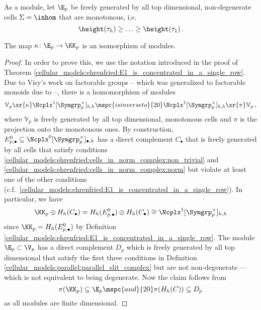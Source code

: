 \begin{defi}
    \label{cellular_models:ehrenfried:definition:cells}
    As a module, let $\E_p$ be freely generated by all top dimensional, non-degenerate cells $\Sigma = \inhom$ that are monotonous, i.e.\
    \[
        \height(\tau_h) \ge \ldots \ge \height(\tau_1) \,.
    \]
\end{defi}

\begin{lem}
    \label{cellular_models:ehrenfried:kappa_is_basechange}
    The map $\kappa \colon \E_p \to \KK_p$ is an isomorphism of modules.
\end{lem}

\begin{proof}
    In order to prove this, we use the notation introduced in the proof of Theorem \ref{cellular_models:ehrenfried:E1_is_concentrated_in_a_single_row}.
    Due to Visy's work on factorable groups \cite[Theorem 5.4.1]{Visy201011} -- which was generalized to factorable monoids due to \cite[Proposition 3.3.6]{Hess2012} --,
    there is a homomorphism of modules
    \[
        \mathbb V_p \xr{\kappa} \Ncplx^1[\Symgrp^\times_p]_{h,h} \mspc{is inverse to}{20} \Ncplx^1[\Symgrp^\times_p]_{h,h} \xr{\pi} \mathbb V_p \,,
    \]
    \label{page:visy_complex}%
    where $\mathbb V_p$ is freely generated by all top dimensional, monotonous cells and $\pi$ is the projection onto the monotonous ones.
    By construction, $E^0_{p,\bullet} \subseteq \Ncplx^0[\Symgrp^\times_p]_{\bullet,h}$ has a direct complement $C_\bullet$ that
    is freely generated by all cells that satisfy conditions \ref{cellular_models:ehrenfried:cells_in_norm_complex:non_trivial} and \ref{cellular_models:ehrenfried:cells_in_norm_complex:norm} but
    violate at least one of the other conditions (c.f.\ \ref{cellular_models:ehrenfried:E1_is_concentrated_in_a_single_row}).
    In particular, we have
    \[
        \KK_p \oplus H_h(C_\bullet) = H_h(E^0_{p,\bullet})\oplus H_h(C_\bullet) \cong \Ncplx^1[\Symgrp^\times_p]_{h,h}
    \]
    since $\KK_p = H_h(E^0_{p,\bullet})$ by Definition \ref{cellular_models:ehrenfried:E1_is_concentrated_in_a_single_row}.
    The module $\E_p \subset \V_p$ has a direct complement $D_p$ which is freely generated by all top dimensional
    that satisfy the first three conditions in Definition \ref{cellular_models:parallel:parallel_slit_complex} but are not non-degenerate --- which is not equivalent to being degenerate.
    Now the claim follows from
    \[
        \pi(\KK_p) \subseteq \E_p \mspc{and}{20} \pi(H_h(C)) \subseteq D_p
    \]
    as all modules are finite dimensional.
\end{proof}

